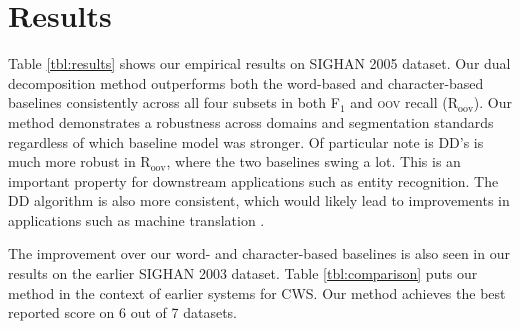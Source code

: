 \section{Results}

Table \ref{tbl:results} shows our empirical results on SIGHAN 2005 dataset. Our dual decomposition method outperforms both the word-based and character-based baselines  consistently across all four subsets in both F$_1$ and \textsc{oov} recall (R$_{\mathrm{oov}}$). Our method demonstrates a robustness across domains and segmentation standards regardless of which baseline model was stronger. Of particular note is DD's is much more robust in R$_{\mathrm{oov}}$, where the two baselines swing a lot. This is an important property for downstream applications such as entity recognition. The DD algorithm is also more consistent, which would likely lead to improvements in applications such as machine translation \cite{Chang:2008:ACL}. 

The improvement over our word- and character-based baselines is also seen in our results on the earlier SIGHAN 2003 dataset.
Table \ref{tbl:comparison} puts our method in the context of earlier systems for CWS. Our method achieves the best reported score on 6 out of 7 datasets.


